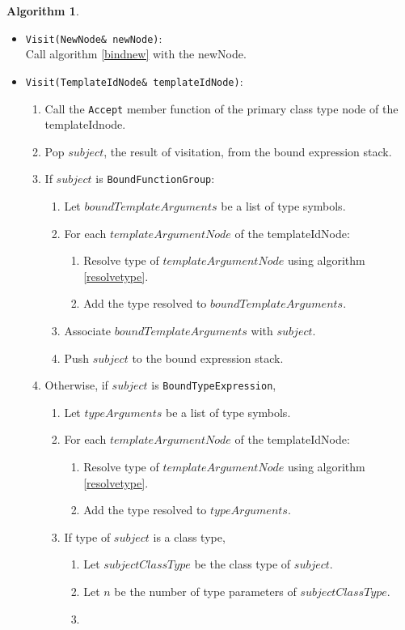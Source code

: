 \documentclass[a4paper,oneside,11pt]{book}
\theoremstyle{definition}
\newtheorem{algo}{Algorithm}[section]
\begin{document}
\begin{algo}
\begin{itemize}
\item
\verb|Visit(NewNode& newNode)|:\\
Call algorithm \ref{bindnew} with the newNode.
\item
\verb|Visit(TemplateIdNode& templateIdNode)|:\\
\begin{enumerate}
\item
Call the \verb|Accept| member function of the primary class type node of the templateIdnode.
\item
Pop $subject$, the result of visitation, from the bound expression stack.
\item
If $subject$ is \verb|BoundFunctionGroup|:
\begin{enumerate}
\item
Let $boundTemplateArguments$ be a list of type symbols.
\item
For each $templateArgumentNode$ of the templateIdNode:
\begin{enumerate}
\item
Resolve type of $templateArgumentNode$ using algorithm \ref{resolvetype}.
\item
Add the type resolved to $boundTemplateArguments$.
\end{enumerate}
\item
Associate $boundTemplateArguments$ with $subject$.
\item
Push $subject$ to the bound expression stack.
\end{enumerate}
\item
Otherwise, if $subject$ is \verb|BoundTypeExpression|,
\begin{enumerate}
\item
Let $typeArguments$ be a list of type symbols.
\item
For each $templateArgumentNode$ of the templateIdNode:
\begin{enumerate}
\item
Resolve type of $templateArgumentNode$ using algorithm \ref{resolvetype}.
\item
Add the type resolved to $typeArguments$.
\end{enumerate}
\item
If type of $subject$ is a class type,
\begin{enumerate}
\item
Let $subjectClassType$ be the class type of $subject$.
\item
Let $n$ be the number of type parameters of $subjectClassType$.
\item

\end{enumerate}
\end{enumerate}
\end{enumerate}
\end{itemize}
\end{algo}
\end{document}
